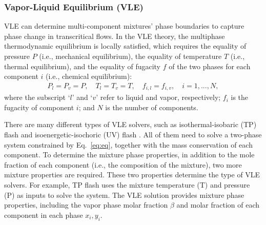 \subsubsection{Vapor-Liquid Equilibrium (VLE)}
VLE can determine multi-component mixtures' phase boundaries to capture phase change in transcritical flows. In the VLE theory, the multiphase thermodynamic equilibrium is locally satisfied, which requires the equality of pressure $P$ (i.e., mechanical equilibrium), the equality of temperature $T$ (i.e., thermal equilibrium), and the equality of fugacity $f$ of the two phases for each component $i$ (i.e., chemical equilibrium):
\begin{align}
P_l=P_v=P,\quad T_l=T_v=T,\quad f_{i,l}=f_{i,v},\quad i=1,...,N, \label{eq:eq}
\end{align}
where the subscript `$l$' and `$v$' refer to liquid and vapor, respectively; $f_i$ is the fugacity of component $i$; and $N$ is the number of components.

There are many different types of VLE solvers, such as isothermal-isobaric (TP) flash \cite{michelsen1982isothermal} and isoenergetic-isochoric (UV) flash \cite{saha1997isoenergetic}. All of them need to solve a two-phase system constrained by Eq.~\ref{eq:eq}, together with the mass conservation of each component. To determine the mixture phase properties, in addition to the mole fraction of each component (i.e., the composition of the mixture), two more mixture properties are required. These two properties determine the type of VLE solvers. For example, TP flash uses the mixture temperature (T) and pressure (P) as inputs to solve the system. The VLE solution provides mixture phase properties, including the vapor phase molar fraction $\beta$ and molar fraction of each component in each phase $x_i,y_i$. 


